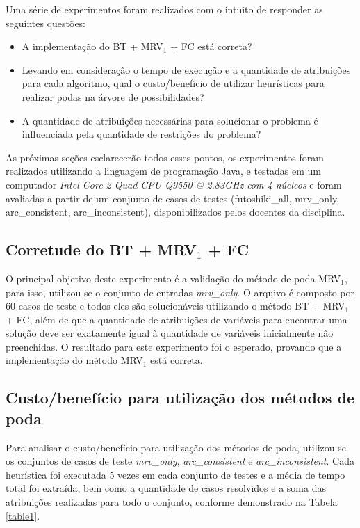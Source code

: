 \documentclass[9pt,technote,compsoc]{IEEEtran}
\begin{document}
Uma série de experimentos foram realizados com o intuito de responder as seguintes questões:

\begin{itemize}
\item A implementação do BT + MRV$_{1}$ + FC está correta?
\item Levando em consideração o tempo de execução e a quantidade de atribuições para cada algoritmo, qual o custo/benefício de utilizar heurísticas para realizar podas na árvore de possibilidades?
\item A quantidade de atribuições necessárias para solucionar o problema é influenciada pela quantidade de restrições do problema?
\end{itemize}

As próximas seções esclarecerão todos esses pontos, os experimentos foram realizados utilizando a linguagem de programação Java, e testadas em um computador \textit{Intel Core 2 Quad CPU Q9550 @ 2.83GHz com 4 núcleos} e foram avaliadas a partir de um conjunto de casos de testes (futoshiki\_all, mrv\_only, arc\_consistent, arc\_inconsistent), disponibilizados pelos docentes da disciplina.

\subsection{Corretude do BT + MRV$_{1}$ + FC}

O principal objetivo deste experimento é a validação do método de poda MRV$_{1}$, para isso, utilizou-se o conjunto de entradas \textit{mrv\_only}. O arquivo é composto por 60 casos de teste e todos eles são solucionáveis utilizando o método BT + MRV$_{1}$ + FC, além de que a quantidade de atribuições de variáveis para encontrar uma solução deve ser exatamente igual à quantidade de variáveis inicialmente não preenchidas. O resultado para este experimento foi o esperado, provando que a implementação do método MRV$_{1}$ está correta.

\subsection{Custo/benefício para utilização dos métodos de poda}

Para analisar o custo/benefício para utilização dos métodos de poda, utilizou-se os conjuntos de casos de teste \textit{mrv\_only}, \textit{arc\_consistent} e \textit{arc\_inconsistent}. Cada heurística foi executada 5 vezes em cada conjunto de testes e a média de tempo total foi extraída, bem como a quantidade de casos resolvidos e a soma das atribuições realizadas para todo o conjunto, conforme demonstrado na Tabela \ref{table1}.
\end{document}

